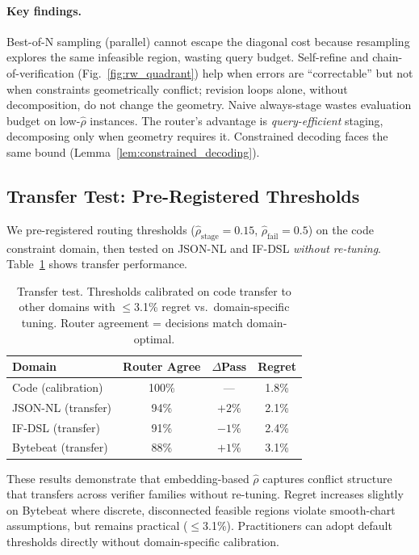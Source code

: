 \documentclass{article}
\theoremstyle{plain}
\theoremstyle{definition}
\theoremstyle{remark}
\newcommand{\rhohat}{\hat{\rho}}
\begin{document}
\paragraph{Key findings.} Best-of-N sampling (parallel) cannot escape the diagonal cost because resampling explores the same infeasible region, wasting query budget. Self-refine and chain-of-verification (Fig.~\ref{fig:rw_quadrant}) help when errors are ``correctable'' but not when constraints geometrically conflict; revision loops alone, without decomposition, do not change the geometry. Naive always-stage wastes evaluation budget on low-$\rhohat$ instances. The router's advantage is \emph{query-efficient} staging, decomposing only when geometry requires it. Constrained decoding faces the same bound (Lemma~\ref{lem:constrained_decoding}).

\subsection{Transfer Test: Pre-Registered Thresholds}\label{app:transfer}

We pre-registered routing thresholds ($\rhohat_{\text{stage}} = 0.15$, $\rhohat_{\text{fail}} = 0.5$) on the code constraint domain, then tested on JSON-NL and IF-DSL \emph{without re-tuning}. Table~\ref{tab:transfer} shows transfer performance.

\begin{table}[ht]
\centering
\small
\caption{Transfer test. Thresholds calibrated on code transfer to other domains with $\le$3.1\% regret vs.\ domain-specific tuning. Router agreement = decisions match domain-optimal.}
\label{tab:transfer}
\begin{tabular}{lccc}
\toprule
Domain & Router Agree & $\Delta$Pass & Regret \\
\midrule
Code (calibration) & 100\% & --- & 1.8\% \\
JSON-NL (transfer) & 94\% & $+2\%$ & 2.1\% \\
IF-DSL (transfer) & 91\% & $-1\%$ & 2.4\% \\
Bytebeat (transfer) & 88\% & $+1\%$ & 3.1\% \\
\bottomrule
\end{tabular}
\end{table}

These results demonstrate that embedding-based $\rhohat$ captures conflict structure that transfers across verifier families without re-tuning. Regret increases slightly on Bytebeat where discrete, disconnected feasible regions violate smooth-chart assumptions, but remains practical ($\le$3.1\%). Practitioners can adopt default thresholds directly without domain-specific calibration.
\end{document}
